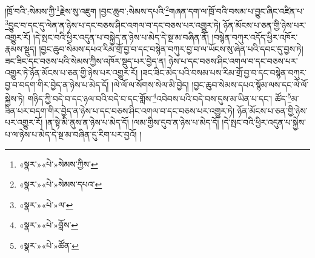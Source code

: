 །ཁྲོ་བའི་:སེམས་ཀྱི་\footnote{«སྣར་»«པེ་»སེམས་ཀྱིས་}རྗེས་སུ་འཇུག །བྱང་ཆུབ་:སེམས་དཔའི་\footnote{«སྣར་»«པེ་»སེམས་དཔའ་}གཞན་དག་ལ་ཁྲོ་བའི་བསམ་པ་བྱུང་ཞིང་འཛིན་པ་\footnote{«སྣར་»«པེ་»ལ་}བྱུང་བ་དང་དུ་ལེན་ན་ཉེས་པ་དང་བཅས་ཤིང་འགལ་བ་དང་བཅས་པར་འགྱུར་ཏེ། ཉོན་མོངས་པ་ཅན་གྱི་ཉེས་པར་འགྱུར་རོ། །དེ་སྤང་བའི་ཕྱིར་འདུན་པ་བསྐྱེད་ན་ཉེས་པ་མེད་དེ་སྔ་མ་བཞིན་ནོ། །བསྙེན་བཀུར་འདོད་ཕྱིར་འཁོར་རྣམས་སྡུད། །བྱང་ཆུབ་སེམས་དཔའ་རིམ་གྲོ་བྱ་བ་དང་བསྙེན་བཀུར་བྱ་བ་ལ་ཡོངས་སུ་ཞེན་པའི་དབང་དུ་བྱས་ཏེ། ཟང་ཟིང་དང་བཅས་པའི་སེམས་ཀྱིས་འཁོར་སྡུད་པར་བྱེད་ན། ཉེས་པ་དང་བཅས་ཤིང་འགལ་བ་དང་བཅས་པར་འགྱུར་ཏེ་ཉོན་མོངས་པ་ཅན་གྱི་ཉེས་པར་འགྱུར་རོ། །ཟང་ཟིང་མེད་པའི་བསམ་པས་རིམ་གྲོ་བྱ་བ་དང་བསྙེན་བཀུར་བྱ་བ་བདག་གིར་བྱེད་ན་ཉེས་པ་མེད་དོ། །ལེ་ལོ་ལ་སོགས་སེལ་མི་བྱེད། །བྱང་ཆུབ་སེམས་དཔའ་སྙོམ་ལས་དང་ལེ་ལོ་སྐྱེས་ཏེ། གཉིད་ཀྱི་བདེ་བ་དང་ཉལ་བའི་བདེ་བ་དང་གློས་\footnote{«སྣར་»«པེ་»བློས་}འབེབས་པའི་བདེ་བས་དུས་མ་ཡིན་པ་དང་། ཚོད་\footnote{«སྣར་»«པེ་»ཚོན་}མ་ཟིན་པར་བདག་གིར་བྱེད་ན་ཉེས་པ་དང་བཅས་ཤིང་འགལ་བ་དང་བཅས་པར་འགྱུར་ཏེ། ཉོན་མོངས་པ་ཅན་གྱི་ཉེས་པར་འགྱུར་རོ། །ན་སྟེ་མི་ནུས་ན་ཉེས་པ་མེད་དོ། །ལམ་གྱིས་དུབ་ན་ཉེས་པ་མེད་དོ། །དེ་སྤང་བའི་ཕྱིར་འདུན་པ་སྐྱེས་པ་ལ་ཉེས་པ་མེད་དེ་སྔ་མ་བཞིན་དུ་རིག་པར་བྱའོ། །
